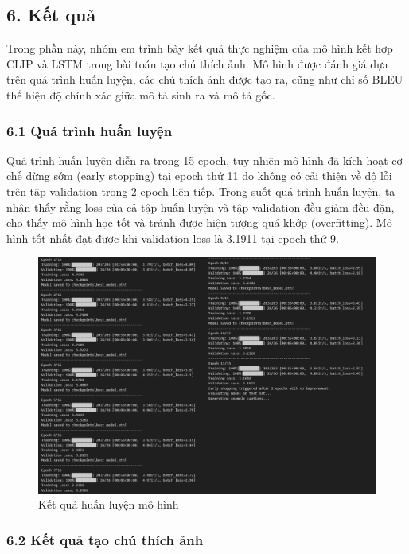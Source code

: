 \documentclass[../main.tex]{subfiles}
\begin{document}
\subsection*{6. Kết quả}

Trong phần này, nhóm em trình bày kết quả thực nghiệm của mô hình kết hợp CLIP và LSTM trong bài toán tạo chú thích ảnh. Mô hình được đánh giá dựa trên quá trình huấn luyện, các chú thích ảnh được tạo ra, cũng như chỉ số BLEU thể hiện độ chính xác giữa mô tả sinh ra và mô tả gốc.

\subsubsection*{6.1 Quá trình huấn luyện}

Quá trình huấn luyện diễn ra trong 15 epoch, tuy nhiên mô hình đã kích hoạt cơ chế dừng sớm (early stopping) tại epoch thứ 11 do không có cải thiện về độ lỗi trên tập validation trong 2 epoch liên tiếp. Trong suốt quá trình huấn luyện, ta nhận thấy rằng loss của cả tập huấn luyện và tập validation đều giảm đều đặn, cho thấy mô hình học tốt và tránh được hiện tượng quá khớp (overfitting). Mô hình tốt nhất đạt được khi validation loss là 3.1911 tại epoch thứ 9.

\begin{figure}[H]
    \centering
    \includegraphics[width=1\textwidth]{Image/result.png}
    \caption{Kết quả huấn luyện mô hình}
    \label{fig:loss}
\end{figure}

\subsubsection*{6.2 Kết quả tạo chú thích ảnh}
\end{document}
